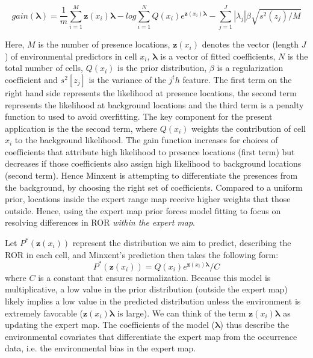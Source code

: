 \begin{equation}
  \label{eq:Lik}
		gain(\boldsymbol\lambda)=\frac{1}{m} \sum_{i=1}^{M} \mathbf{z}(x_i)\boldsymbol\lambda -log\sum_{i=1}^{N}Q(x_i)e^{\mathbf{z}(x_i)\boldsymbol\lambda} -  \sum_{j=1}^{J} |\lambda_{j}|\beta \sqrt{s^2 (z_j)/M}
\end{equation}


Here, $M$ is the number of presence locations, $\mathbf{z}(x_i)$ denotes the vector (length $J$) of environmental predictors in cell $x_i$, $\boldsymbol\lambda$ is a vector of fitted coefficients, $N$ is the total number of cells, $Q(x_i)$ is the prior distribution, $\beta$ is a regularization coefficient and $s^2 [z_j]$ is the variance of the $j^th$ feature. The first term on the right hand side represents the likelihood at presence locations, the second term represents the likelihood at background locations and the third term is a penalty function to used to avoid overfitting. The key component for the present application is the the second term, where $Q(x_i)$ weights the contribution of cell $x_i$ to the background likelihood.  The gain function increases for choices of coefficients that attribute high likelihood to presence locations (first term) but decreases if those coefficients also assign high likelihood to background locations (second term). Hence Minxent is attempting to differentiate the presences from the background, by choosing the right set of coefficients. Compared to a uniform prior, locations inside the expert range map receive higher weights that those outside. Hence, using the expert map prior forces model fitting to focus on resolving differences in ROR \textit{within the expert map}. 


Let $P^*(\mathbf{z}(x_i))$ represent the distribution we aim to predict, describing the ROR in each cell, and Minxent's prediction then takes the following form: 
	\begin{equation}
	\label{eq:solution}
		P^*(\mathbf{z}(x_i))=Q(x_i)e^{\mathbf{z}(x_i)\boldsymbol\lambda}/C
	\end{equation}
where $C$ is a constant that ensures normalization. Because this model is multiplicative, a low value in the prior distribution (outside the expert map) likely implies a low value in the predicted distribution unless the environment is extremely favorable ($\mathbf{z}(x_i)\boldsymbol\lambda$ is large). We can think of the term $\mathbf{z}(x_i)\boldsymbol\lambda$ as updating the expert map. The coefficients of the model ($\boldsymbol\lambda$) thus describe the environmental covariates that differentiate the expert map from the occurrence data, i.e. the environmental bias in the expert map.


